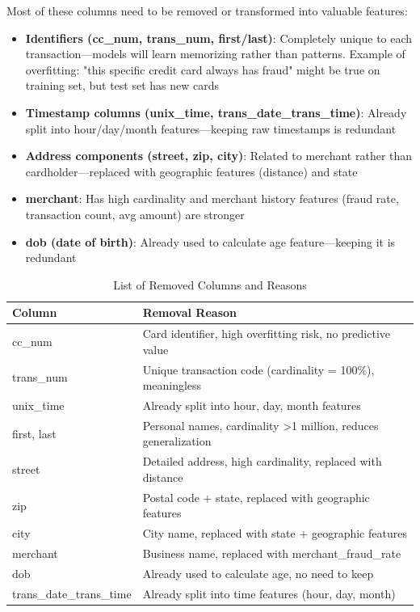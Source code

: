 Most of these columns need to be removed or transformed into valuable features:
\begin{itemize}
    \item \textbf{Identifiers (cc\_num, trans\_num, first/last)}: Completely unique to each transaction---models will learn memorizing rather than patterns. Example of overfitting: "this specific credit card always has fraud" might be true on training set, but test set has new cards
    \item \textbf{Timestamp columns (unix\_time, trans\_date\_trans\_time)}: Already split into hour/day/month features---keeping raw timestamps is redundant
    \item \textbf{Address components (street, zip, city)}: Related to merchant rather than cardholder---replaced with geographic features (distance) and state
    \item \textbf{merchant}: Has high cardinality and merchant history features (fraud rate, transaction count, avg amount) are stronger
    \item \textbf{dob (date of birth)}: Already used to calculate age feature---keeping it is redundant
\end{itemize}

\begin{table}[H]
\centering
\caption{List of Removed Columns and Reasons}
\footnotesize
\begin{tabular}{|l|p{6cm}|}
\hline
\textbf{Column} & \textbf{Removal Reason} \\
\hline
cc\_num & Card identifier, high overfitting risk, no predictive value \\
\hline
trans\_num & Unique transaction code (cardinality = 100\%), meaningless \\
\hline
unix\_time & Already split into hour, day, month features \\
\hline
first, last & Personal names, cardinality >1 million, reduces generalization \\
\hline
street & Detailed address, high cardinality, replaced with distance \\
\hline
zip & Postal code + state, replaced with geographic features \\
\hline
city & City name, replaced with state + geographic features \\
\hline
merchant & Business name, replaced with merchant\_fraud\_rate \\
\hline
dob & Already used to calculate age, no need to keep \\
\hline
trans\_date\_trans\_time & Already split into time features (hour, day, month) \\
\hline
\end{tabular}
\end{table}

